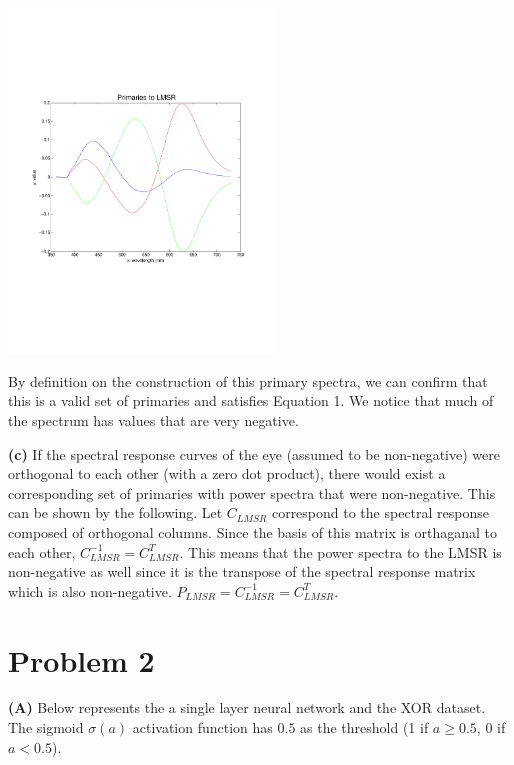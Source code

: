 \documentclass[12pt,twoside]{article}
\newcommand{\tabUnit}{3ex}
\newcommand{\tabT}{\hspace*{\tabUnit}}
\begin{document}
\tabT\tabT\tabT\tabT\tabT\tabT\tabT 
\includegraphics[width = 200pt, trim = 50pt 50pt 50pt 50pt, clip]{P_LMSR} 

By definition on the construction of this primary spectra, we can confirm that this is a valid set of primaries and satisfies Equation 1.  We notice that much of the spectrum has values that are very negative.
\newline

\tabT \textbf{(c)} If the spectral response curves of the eye (assumed to be non-negative) were orthogonal to each other (with a zero dot product), there would exist a corresponding set of primaries with power spectra that were non-negative.  This can be shown by the following.  Let $C_{LMSR}$ correspond to the spectral response composed of orthogonal columns.  Since the basis of this matrix is orthaganal to each other, $C_{LMSR}^{-1} = C_{LMSR}^{T}$.  This means that the power spectra to the LMSR is non-negative as well since it is the transpose of the spectral response matrix which is also non-negative. $P_{LMSR} = C_{LMSR}^{-1} = C_{LMSR}^{T}$. 
\newline


\section*{Problem 2}
\tabT \textbf{(A)} Below represents the a single layer neural network and the XOR dataset.  The sigmoid $\sigma(a)$ activation function has $0.5$ as the threshold (1 if $a \geq 0.5$, 0 if $a < 0.5$).
\newline
\newline
\end{document}
